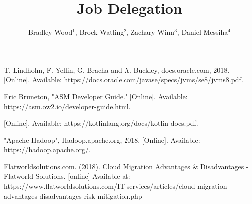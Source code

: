 \documentclass[letterpaper, 11 pt, conference]{ieeeconf}
\title{Job Delegation}
\author{Bradley Wood$^{1}$, Brock Watling$^{2}$, Zachary Winn$^{3}$, Daniel Messiha$^{4}$}
\begin{document}
    \maketitle
    \thispagestyle{empty}
    \pagestyle{empty}

    

    

    

    

    

    

    

    

    

    

    \addtolength{\textheight}{-12cm}


    \begin{thebibliography}{99}

        T. Lindholm, F. Yellin, G. Bracha and A. Buckley, docs.oracle.com, 2018. [Online].
        Available: https://docs.oracle.com/javase/specs/jvms/se8/jvms8.pdf.

        Eric Bruneton, "ASM Developer Guide." [Online].
        Available: https://asm.ow2.io/developer-guide.html.

        [Online].
        Available: https://kotlinlang.org/docs/kotlin-docs.pdf.

        "Apache Hadoop", Hadoop.apache.org, 2018. [Online].
        Available: https://hadoop.apache.org/.

        Flatworldsolutions.com. (2018).
        Cloud Migration Advantages & Disadvantages - Flatworld Solutions.
        [online] Available at: https://www.flatworldsolutions.com/IT-services/articles/cloud-migration-advantages-disadvantages-risk-mitigation.php


    \end{thebibliography}
\end{document}
